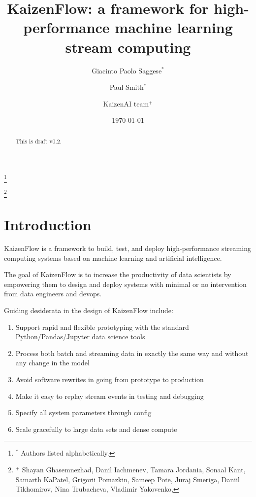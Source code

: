 \documentclass[11pt, reqno]{amsart}
\theoremstyle{definition}
\theoremstyle{remark}
\begin{document}
  \title{KaizenFlow: a framework for high-performance machine learning stream computing}

  \author{Giacinto Paolo Saggese$^{*}$}
  \author{Paul Smith$^{*}$}
  \author{KaizenAI team$^{+}$}
  \thanks{$^{*}$ Authors listed alphabetically.}

  \thanks{$^{+}$
  Shayan Ghasemnezhad,
  Danil Iachmenev,
  Tamara Jordania,
  Sonaal Kant,
  Samarth KaPatel,
  Grigorii Pomazkin,
  Sameep Pote,
  Juraj Smeriga,
  Daniil Tikhomirov,
  Nina Trubacheva,
  Vladimir Yakovenko, }

  \date{\today}

  \begin{abstract}
    This is draft v0.2.
  \end{abstract}

  \maketitle

  \setcounter{tocdepth}{2}
  \tableofcontents

  \section{Introduction}

  KaizenFlow is a framework to build, test, and deploy high-performance
  streaming computing systems based on machine learning and artificial
  intelligence.

  The goal of KaizenFlow is to increase the productivity of data scientists by
  empowering them to design and deploy systems with minimal or no intervention
  from data engineers and devops.

  Guiding desiderata in the design of KaizenFlow include:
  \begin{enumerate}
    \item Support rapid and flexible prototyping with the standard Python/Pandas/Jupyter
      data science tools

    \item Process both batch and streaming data in exactly the same way and without
      any change in the model

    \item Avoid software rewrites in going from prototype to production

    \item Make it easy to replay stream events in testing and debugging

    \item Specify all system parameters through config

    \item Scale gracefully to large data sets and dense compute
  \end{enumerate}
\end{document}
